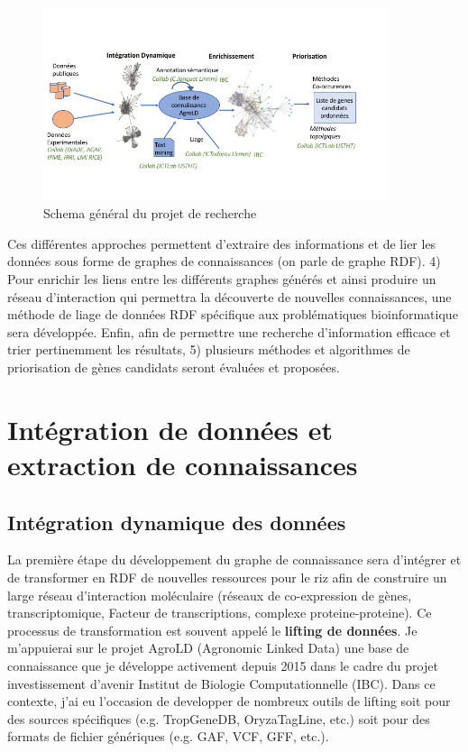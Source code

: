 \begin{figure}[!ht]
\begin{center}
	\includegraphics[width=0.9\textwidth]{Figures/schema-projet-recherche.png}
\end{center}
\caption{\label{schema-general} Schema général du projet de recherche}
\end{figure}

Ces différentes approches permettent d’extraire des informations et de lier les données sous forme de graphes de connaissances (on parle de graphe RDF). 4) Pour enrichir les liens entre les différents graphes générés et ainsi produire un réseau d’interaction qui permettra la découverte de nouvelles connaissances, une méthode de liage de données RDF spécifique aux problématiques bioinformatique sera développée. Enfin, afin de permettre une recherche d’information efficace et trier pertinemment les résultats, 5) plusieurs méthodes et algorithmes de priorisation de gènes candidats seront évaluées et proposées. \\




\section{Intégration de données et extraction de connaissances}




\subsection{Intégration dynamique des données}

La première étape du développement du graphe de connaissance sera d’intégrer et de transformer en RDF de nouvelles ressources pour le riz afin de construire un large réseau d’interaction moléculaire (réseaux de co-expression de gènes, transcriptomique, Facteur de transcriptions, complexe proteine-proteine). Ce processus de transformation est souvent appelé le \textbf{lifting de données}. Je m’appuierai sur le projet AgroLD (Agronomic Linked Data) une base de connaissance que je développe activement depuis 2015 dans le cadre du projet investissement d’avenir Institut de Biologie Computationnelle (IBC). Dans ce contexte, j'ai eu l'occasion de developper de nombreux outils de lifting soit pour des sources spécifiques (e.g.  TropGeneDB, OryzaTagLine, etc.) soit pour des formats de fichier génériques (e.g. GAF, VCF, GFF, etc.). \\

